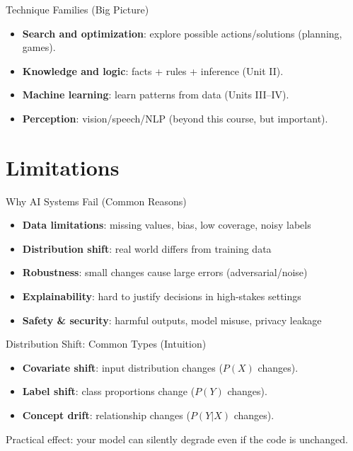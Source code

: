 \documentclass[aspectratio=169]{beamer}
\begin{document}
\begin{frame}{Technique Families (Big Picture)}
  \begin{itemize}[<+->]
    \item \textbf{Search and optimization}: explore possible actions/solutions (planning, games).
    \item \textbf{Knowledge and logic}: facts + rules + inference (Unit II).
    \item \textbf{Machine learning}: learn patterns from data (Units III--IV).
    \item \textbf{Perception}: vision/speech/NLP (beyond this course, but important).
  \end{itemize}
\end{frame}

\section{Limitations}
\label{sec:limits}

\begin{frame}{Why AI Systems Fail (Common Reasons)}
  \begin{itemize}[<+->]
    \item \textbf{Data limitations}: missing values, bias, low coverage, noisy labels
    \item \textbf{Distribution shift}: real world differs from training data
    \item \textbf{Robustness}: small changes cause large errors (adversarial/noise)
    \item \textbf{Explainability}: hard to justify decisions in high-stakes settings
    \item \textbf{Safety \& security}: harmful outputs, model misuse, privacy leakage
  \end{itemize}
\end{frame}

\begin{frame}{Distribution Shift: Common Types (Intuition)}
  \begin{itemize}[<+->]
    \item \textbf{Covariate shift}: input distribution changes ($P(X)$ changes).
    \item \textbf{Label shift}: class proportions change ($P(Y)$ changes).
    \item \textbf{Concept drift}: relationship changes ($P(Y|X)$ changes).
  \end{itemize}
  \vspace{0.4em}
  Practical effect: your model can silently degrade even if the code is unchanged.
\end{frame}
\end{document}
